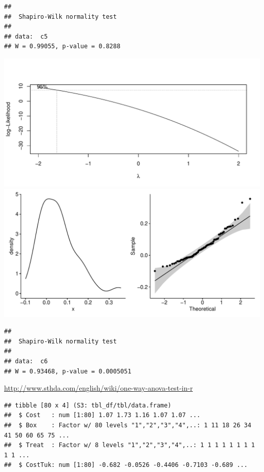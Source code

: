 \documentclass[
  11pt,
]{article}
\begin{document}
\begin{verbatim}
## 
##  Shapiro-Wilk normality test
## 
## data:  c5
## W = 0.99055, p-value = 0.8288
\end{verbatim}

\includegraphics{def_files/figure-latex/unnamed-chunk-19-6.pdf}
\includegraphics{def_files/figure-latex/unnamed-chunk-19-7.pdf}

\begin{verbatim}
## 
##  Shapiro-Wilk normality test
## 
## data:  c6
## W = 0.93468, p-value = 0.0005051
\end{verbatim}

\url{http://www.sthda.com/english/wiki/one-way-anova-test-in-r}

\begin{verbatim}
## tibble [80 x 4] (S3: tbl_df/tbl/data.frame)
##  $ Cost   : num [1:80] 1.07 1.73 1.16 1.07 1.07 ...
##  $ Box    : Factor w/ 80 levels "1","2","3","4",..: 1 11 18 26 34 41 50 60 65 75 ...
##  $ Treat  : Factor w/ 8 levels "1","2","3","4",..: 1 1 1 1 1 1 1 1 1 1 ...
##  $ CostTuk: num [1:80] -0.682 -0.0526 -0.4406 -0.7103 -0.689 ...
\end{verbatim}
\end{document}
